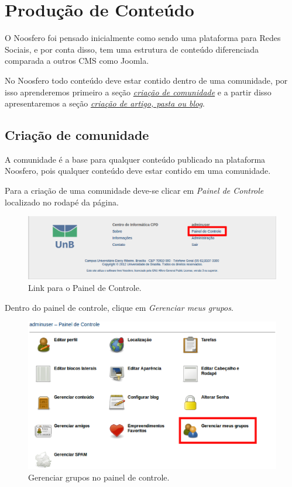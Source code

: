 \chapter{Produção de Conteúdo}
\label{chap:producaoConteudo}

O Noosfero foi pensado inicialmente como sendo uma plataforma para Redes Sociais, e por conta disso, tem uma estrutura de conteúdo diferenciada comparada a outros CMS como Joomla.

No Noosfero todo conteúdo deve estar contido dentro de uma comunidade, por isso aprenderemos primeiro a seção \emph{\hyperref[sec:criarComunidade]{criação de comunidade}} e a partir disso apresentaremos a seção \emph{\hyperref[sec:criarConteudo]{criação de artigo, pasta ou blog}}.

\section{Criação de comunidade}
\label{sec:criarComunidade}

A comunidade é a base para qualquer conteúdo publicado na plataforma Noosfero, pois qualquer conteúdo deve estar contido em uma comunidade.

Para a criação de uma comunidade deve-se clicar em \emph{\color{red}Painel de Controle} localizado no rodapé da página.

\begin{figure}[H]
  \centering
    \includegraphics[keepaspectratio=true,scale=0.49]{figuras/linkPainelControle.eps}    
  \caption{Link para o Painel de Controle.}
  \label{fig:linkPainelControle}
\end{figure}

\newpage
Dentro do painel de controle, clique em \emph{\color{red}Gerenciar meus grupos}.

\begin{figure}[H]
  \centering
    \includegraphics[keepaspectratio=true,scale=0.49]{figuras/painelDeControle.eps}
  \caption{Gerenciar grupos no painel de controle.}
  \label{fig:GerGrupPainelControle}
\end{figure}

